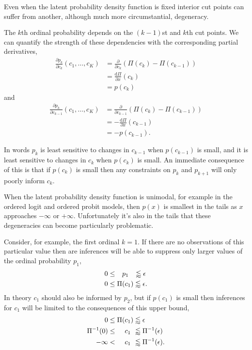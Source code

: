 \documentclass[
  letterpaper,
  DIV=11,
  numbers=noendperiod]{scrartcl}
\begin{document}
Even when the latent probability density function is fixed interior cut
points can suffer from another, although much more circumstantial,
degeneracy.

The \(k\)th ordinal probability depends on the \((k - 1)\)st and \(k\)th
cut points. We can quantify the strength of these dependencies with the
corresponding partial derivatives, \begin{align*}
\frac{ \partial p_{k} }{ \partial c_{k} } (c_{1}, \ldots, c_{K})
&=
\frac{ \partial }{ \partial c_{k} }
\left( \Pi( c_{k} ) - \Pi( c_{k - 1} ) \right)
\\
&=
\frac{ \mathrm{d} \Pi }{ \partial x } (c_{k})
\\
&=
p( c_{k} )
\end{align*} and \begin{align*}
\frac{ \partial p_{k} }{ \partial c_{k - 1} } (c_{1}, \ldots, c_{K})
&=
\frac{ \partial }{ \partial c_{k - 1} }
\left( \Pi( c_{k} ) - \Pi( c_{k - 1} ) \right)
\\
&=
- \frac{ \mathrm{d} \Pi }{ \partial x } (c_{k - 1})
\\
&=
-p( c_{k - 1} ).
\end{align*}

In words \(p_{k}\) is least sensitive to changes in \(c_{k - 1}\) when
\(p( c_{k - 1} )\) is small, and it is least sensitive to changes in
\(c_{k}\) when \(p(c_{k})\) is small. An immediate consequence of this
is that if \(p(c_{k})\) is small then any constraints on \(p_{k}\) and
\(p_{k + 1}\) will only poorly inform \(c_{k}\).

When the latent probability density function is unimodal, for example in
the ordered logit and ordered probit models, then \(p(x)\) is smallest
in the tails as \(x\) approaches \(-\infty\) or \(+\infty\).
Unfortunately it's also in the tails that these degeneracies can become
particularly problematic.

Consider, for example, the first ordinal \(k = 1\). If there are no
observations of this particular value then are inferences will be able
to suppress only larger values of the ordinal probability \(p_{1}\),
\begin{align*}
0 &\le \hphantom{\Pi} p_{1} \hphantom{()} \lessapprox \epsilon
\\
0 &\le \Pi(c_{1}) \lessapprox \epsilon.
\end{align*} In theory \(c_{1}\) should also be informed by \(p_{2}\),
but if \(p(c_{1})\) is small then inferences for \(c_{1}\) will be
limited to the consequences of this upper bound, \begin{align*}
0 &\le \Pi(c_{1}) \lessapprox \epsilon
\\
\Pi^{-1}(0) &\le
\hphantom{\Pi(} c_{1} \hphantom{)} \lessapprox
\Pi^{-1}(\epsilon)
\\
-\infty &<
\hphantom{\Pi(} c_{1} \hphantom{)}
\lessapprox \Pi^{-1}(\epsilon).
\end{align*}
\end{document}
